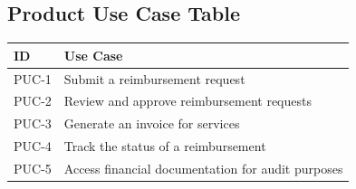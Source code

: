 \documentclass[12pt]{article}
\begin{document}
\subsection{Product Use Case Table}
\begin{tabularx}{\textwidth}{lX}
\toprule
\textbf{ID} & \textbf{Use Case} \\
\midrule
PUC-1 & Submit a reimbursement request \\
PUC-2 & Review and approve reimbursement requests \\
PUC-3 & Generate an invoice for services \\
PUC-4 & Track the status of a reimbursement \\
PUC-5 & Access financial documentation for audit purposes \\
\bottomrule
\end{tabularx}
\end{document}

